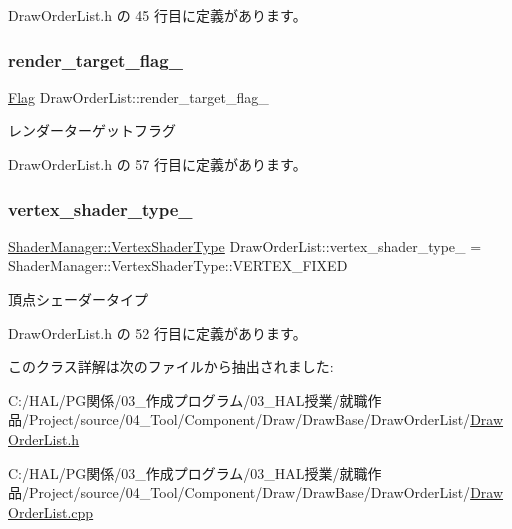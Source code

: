  Draw\+Order\+List.\+h の 45 行目に定義があります。

\mbox{\label{class_draw_order_list_a8da2b635d5b2a9191088f9180d1fe6d6}} 
\subsubsection{\texorpdfstring{render\+\_\+target\+\_\+flag\+\_\+}{render\_target\_flag\_}}
{\footnotesize\ttfamily \mbox{\hyperlink{class_flag}{Flag}} Draw\+Order\+List\+::render\+\_\+target\+\_\+flag\+\_\+\hspace{0.3cm}{\ttfamily [private]}}



レンダーターゲットフラグ 



 Draw\+Order\+List.\+h の 57 行目に定義があります。

\mbox{\label{class_draw_order_list_afcb0968108f4e6932358393a8bc90a8b}} 
\subsubsection{\texorpdfstring{vertex\+\_\+shader\+\_\+type\+\_\+}{vertex\_shader\_type\_}}
{\footnotesize\ttfamily \mbox{\hyperlink{class_shader_manager_a9b51e49d70eb3cc58f6d1f3994e8cfbd}{Shader\+Manager\+::\+Vertex\+Shader\+Type}} Draw\+Order\+List\+::vertex\+\_\+shader\+\_\+type\+\_\+ = Shader\+Manager\+::\+Vertex\+Shader\+Type\+::\+V\+E\+R\+T\+E\+X\+\_\+\+F\+I\+X\+ED\hspace{0.3cm}{\ttfamily [private]}}



頂点シェーダータイプ 



 Draw\+Order\+List.\+h の 52 行目に定義があります。



このクラス詳解は次のファイルから抽出されました\+:\begin{DoxyCompactItemize}
\item 
C\+:/\+H\+A\+L/\+P\+G関係/03\+\_\+作成プログラム/03\+\_\+\+H\+A\+L授業/就職作品/\+Project/source/04\+\_\+\+Tool/\+Component/\+Draw/\+Draw\+Base/\+Draw\+Order\+List/\mbox{\hyperlink{_draw_order_list_8h}{Draw\+Order\+List.\+h}}\item 
C\+:/\+H\+A\+L/\+P\+G関係/03\+\_\+作成プログラム/03\+\_\+\+H\+A\+L授業/就職作品/\+Project/source/04\+\_\+\+Tool/\+Component/\+Draw/\+Draw\+Base/\+Draw\+Order\+List/\mbox{\hyperlink{_draw_order_list_8cpp}{Draw\+Order\+List.\+cpp}}\end{DoxyCompactItemize}
